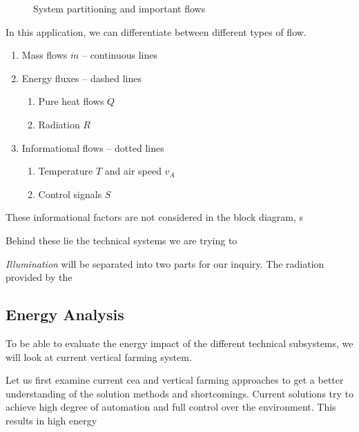 
\begin{figure}[htbp]
  \centering
  
  \caption{System partitioning and important flows}
\end{figure}

In this application, we can differentiate between different types of flow.
\begin{enumerate}
	\item Mass flows $\dot{m}$ -- continuous lines
	\item Energy fluxes -- dashed lines
	\begin{enumerate}
		\item Pure heat flows $\dot{Q}$
		\item Radiation $R$
	\end{enumerate}
	\item Informational flows -- dotted lines
	\begin{enumerate}
		\item Temperature $T$ and air speed $v_A$
		\item Control signals $S$
	\end{enumerate}
\end{enumerate}
These informational factors are not considered in the block diagram, s

Behind these lie the technical systems we are trying to 

\textit{Illumination} will be separated into two parts for our inquiry.
The radiation provided by the 


\subsection{Energy Analysis}
\label{sub:energy-analysis}
To be able to evaluate the energy impact of the different technical subsystems, we will look at current vertical farming system.

Let us first examine current \ac{cea} and vertical farming approaches to get a better understanding of the solution methods and shortcomings.
Current solutions try to achieve high degree of automation and full control over the environment.
This results in high energy

